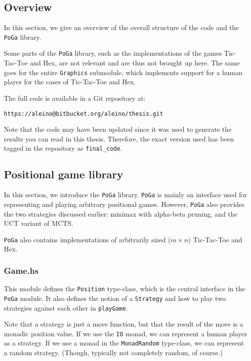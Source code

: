 \subsection {Overview}

In this section, we give an overview of the overall structure of the code and the \texttt{PoGa} library.


Some parts of the \texttt{PoGa} library, such as the implementations of the games Tic-Tac-Toe and Hex, are not relevant and are thus not brought up here.
The same goes for the entire \texttt{Graphics} submodule, which implements support for a human player for the cases of Tic-Tac-Toe and Hex.

The full code is available in a Git repository at:

\texttt{https://aleino@bitbucket.org/aleino/thesis.git}

Note that the code may have been updated since it was used to generate the results you can read in this thesis. Therefore, the exact version used has been tagged in the repository as \texttt{final\_code}.

\subsection {Positional game library}

In this section, we introduce the \texttt{PoGa} library.
\texttt{PoGa} is mainly an interface used for representing and playing arbitrary positional games.
However, \texttt{PoGa} also provides the two strategies discussed earlier: minimax with alpha-beta pruning, and the UCT variant of MCTS.

\texttt{PoGa} also contains implementations of arbitrarily sized ($m \times n$) Tic-Tac-Toe and Hex.

\subsubsection {Game.hs}

This module defines the \texttt{Position} type-class, which is the central interface in the \texttt{PoGa} module.
It also defines the notion of a \texttt{Strategy} and how to play two strategies against each other in \texttt{playGame}.

Note that a strategy is just a move function, but that the result of the move is a monadic position value.
If we use the \texttt{IO} monad, we can represent a human player as a strategy. If we use a monad in the \texttt{MonadRandom} type-class, we can represent a random strategy. (Though, typically not completely random, of course.)


